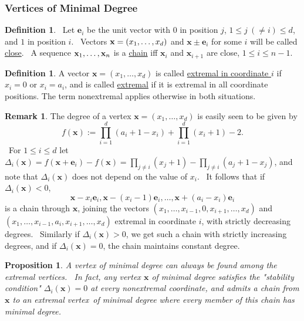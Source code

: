\documentclass[11pt,a4paper]{amsart}
\newtheorem{prop}[thm]{Proposition}
\theoremstyle{definition}
\newtheorem{definition}[thm]{Definition}
\newtheorem{rem}[thm]{Remark}
\numberwithin{equation}{section}
\begin{document}
\subsubsection{Vertices of Minimal Degree}
\begin{definition}
\ Let $\mathbf e_{i}$ be the unit vector with $0$ in position $j$, $%
1\leq j\ (\neq i)\leq d$, and $1$ in position $i$. \ Vectors $\mathbf{%
x}=(x_{1},\ldots ,x_{d})$ and $\mathbf{x}\pm \mathbf e_{i}$
for some $i$ will be called \underline{close}. \ A sequence $\mathbf{%
x}_{1},\ldots ,\mathbf{x}_{n}$ is a \underline{chain} iff $%
\mathbf{x}_{i}$ and $\mathbf{x}_{i+1}$ are close, $1\leq
i\leq n-1$. 
\end{definition}

\begin{definition}
A vector $\mathbf{x}=(x_{1},\ldots ,x_{d})$ is called \underline{%
extremal in coordinate $i$} if $x_{i}=0$ or $x_{i}=a_{i}$, and is called 
\underline{extremal} if it is extremal in all coordinate positions. The term
nonextremal applies otherwise in both situations.
\end{definition}

\begin{rem}
The degree of a vertex $\mathbf{x}=(x_{1},\ldots ,x_{d})$ is easily
seen to be given by $$f(\mathbf{x}):=\prod%
\limits_{i=1}^{d}(a_{i}+1-x_{i})+\prod\limits_{i=1}^{d}(x_{i}+1)-2.$$ \ For $%
1\leq i\leq d$ let $\Delta _{i}(\mathbf{x})=f(\mathbf{x}+%
\mathbf e_{i})-f(\mathbf{x})=\prod\limits_{j\neq
i}^{{}}(x_{j}+1)-\prod\limits_{j\neq i}^{{}}(a_{j}+1-x_{j})$, and note that $%
\Delta _{i}(\mathbf{x})$ does not depend on the value of $x_{i}$. \
It follows that if $\Delta _{i}(\mathbf{x})<0$, 
\[
\mathbf{x}-x_{i}\mathbf e_{i},\mathbf{x}-(x_{i}-1)%
\mathbf e_{i},\ldots ,\mathbf{x}+(a_{i}-x_{i})%
\mathbf e_{i}
\]%
is a chain through $\mathbf{x}$, joining the vectors $(x_{1},\ldots
,x_{i-1},0,x_{i+1},\ldots ,x_{d})$ and \\ $(x_{1},\ldots
,x_{i-1},a_i,x_{i+1},\ldots ,x_{d})$ extremal in coordinate $i$, with strictly
decreasing degrees. \ Similarly if $\Delta _{i}(\mathbf{x})>0$, we
get such a chain with strictly increasing degrees, and if $\Delta _{i}(%
\mathbf{x})=0$, the chain maintains constant degree. 
\end{rem}

\begin{prop}
A vertex of minimal degree can always be found among the extremal vertices.
\ In fact, any vertex  $\mathbf{x}$ of minimal degree satisfies the "stability condition" $%
\Delta _{i}(\mathbf{x})=0$ at every nonextremal coordinate, and
admits a chain from  $\mathbf{x}$ to an extremal vertex\ of minimal
degree where every member of this chain has minimal degree.
\end{prop}
\end{document}
